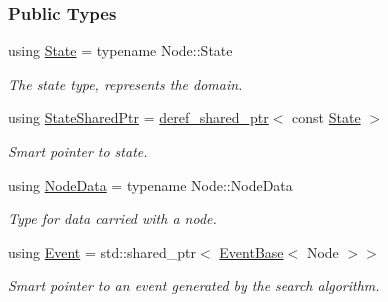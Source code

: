 \subsubsection*{Public Types}
\begin{DoxyCompactItemize}
\item 
using \hyperlink{structEventBase_a174eb2c38ec68481b21f78db338e834c}{State} = typename Node\+::\+State\hypertarget{structEventBase_a174eb2c38ec68481b21f78db338e834c}{}\label{structEventBase_a174eb2c38ec68481b21f78db338e834c}

\begin{DoxyCompactList}\small\item\em The state type, represents the domain. \end{DoxyCompactList}\item 
using \hyperlink{structEventBase_a2c0edb5cda08ce1965f3440a97b3fc87}{State\+Shared\+Ptr} = \hyperlink{classderef__shared__ptr}{deref\+\_\+shared\+\_\+ptr}$<$ const \hyperlink{structEventBase_a174eb2c38ec68481b21f78db338e834c}{State} $>$\hypertarget{structEventBase_a2c0edb5cda08ce1965f3440a97b3fc87}{}\label{structEventBase_a2c0edb5cda08ce1965f3440a97b3fc87}

\begin{DoxyCompactList}\small\item\em Smart pointer to state. \end{DoxyCompactList}\item 
using \hyperlink{structEventBase_a98e31769d6ef4ed8b3f5f0d13cce997b}{Node\+Data} = typename Node\+::\+Node\+Data\hypertarget{structEventBase_a98e31769d6ef4ed8b3f5f0d13cce997b}{}\label{structEventBase_a98e31769d6ef4ed8b3f5f0d13cce997b}

\begin{DoxyCompactList}\small\item\em Type for data carried with a node. \end{DoxyCompactList}\item 
using \hyperlink{structEventBase_a0ff1657dcfd85f6d094902d57e8f2af5}{Event} = std\+::shared\+\_\+ptr$<$ \hyperlink{structEventBase}{Event\+Base}$<$ Node $>$$>$\hypertarget{structEventBase_a0ff1657dcfd85f6d094902d57e8f2af5}{}\label{structEventBase_a0ff1657dcfd85f6d094902d57e8f2af5}

\begin{DoxyCompactList}\small\item\em Smart pointer to an event generated by the search algorithm. \end{DoxyCompactList}\end{DoxyCompactItemize}
